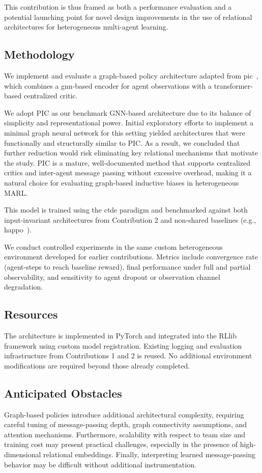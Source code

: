 This contribution is thus framed as both a performance evaluation and a 
potential launching point for novel design improvements in the use of relational 
architectures for heterogeneous multi-agent learning.


\subsection{Methodology}

We implement and evaluate a graph-based policy architecture adapted from 
\gls{pic}~\cite{liu2020b}, which combines a \gls{gnn}-based encoder for 
agent observations with a transformer-based centralized critic. 

We adopt PIC as our benchmark GNN-based architecture due to its 
balance of simplicity and representational power. 
Initial exploratory efforts to implement a minimal 
graph neural network for this setting yielded architectures 
that were functionally and structurally similar to PIC. 
As a result, we concluded that further reduction would risk 
eliminating key relational mechanisms that motivate the study. 
PIC is a mature, well-documented method that supports centralized 
critics and inter-agent message passing without excessive overhead, 
making it a natural choice for evaluating graph-based inductive biases in heterogeneous MARL.

This model is trained using the \gls{ctde} paradigm and benchmarked against 
both input-invariant architectures from Contribution 2 and non-shared 
baselines (e.g., \gls{happo}~\cite{zhong2024}).

We conduct controlled experiments in the same custom heterogeneous 
environment developed for earlier contributions. 
Metrics include convergence rate (agent-steps to reach baseline reward), 
final performance under full and partial observability, 
and sensitivity to agent dropout or observation channel degradation.


\subsection{Resources}

The architecture is implemented in PyTorch and integrated into the RLlib 
framework using custom model registration. 
Existing logging and evaluation infrastructure from Contributions 1 and 2 is reused. 
No additional environment modifications are required beyond those already completed.


\subsection{Anticipated Obstacles}

Graph-based policies introduce additional architectural complexity, 
requiring careful tuning of message-passing depth, 
graph connectivity assumptions, and attention mechanisms. 
Furthermore, scalability with respect to team size and training 
cost may present practical challenges, especially in the 
presence of high-dimensional relational embeddings. 
Finally, interpreting learned message-passing behavior may be 
difficult without additional instrumentation.

